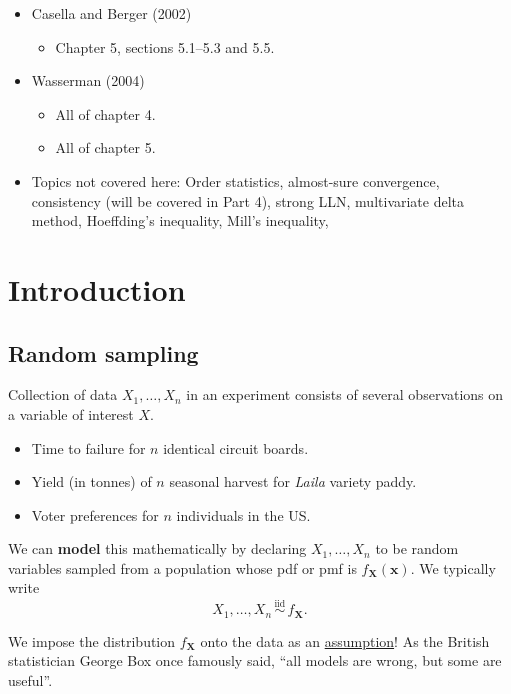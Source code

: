 \documentclass[
]{book}
\providecommand{\tightlist}{%
  \setlength{\itemsep}{0pt}\setlength{\parskip}{0pt}}
\newcommand{\bx}{{\boldsymbol x}}
\newcommand{\bX}{{\boldsymbol X}}
\newcommand{\iid}{\,\overset{\text{iid}}{\sim}\,}
\theoremstyle{definition}
\theoremstyle{definition}
\theoremstyle{definition}
\theoremstyle{definition}
\theoremstyle{remark}
\begin{document}
\begin{itemize}
\tightlist
\item
  Casella and Berger (2002)

  \begin{itemize}
  \tightlist
  \item
    Chapter 5, sections 5.1--5.3 and 5.5.
  \end{itemize}
\item
  Wasserman (2004)

  \begin{itemize}
  \tightlist
  \item
    All of chapter 4.
  \item
    All of chapter 5.
  \end{itemize}
\item
  Topics not covered here: Order statistics, almost-sure convergence, consistency (will be covered in Part 4), strong LLN, multivariate delta method, Hoeffding's inequality, Mill's inequality,
\end{itemize}

\hypertarget{introduction-1}{%
\section{Introduction}\label{introduction-1}}

\hypertarget{random-sampling}{%
\subsection{Random sampling}\label{random-sampling}}

Collection of data \(X_1,\dots,X_n\) in an experiment consists of several observations on a variable of interest \(X\).

\begin{itemize}
\tightlist
\item
  Time to failure for \(n\) identical circuit boards.
\item
  Yield (in tonnes) of \(n\) seasonal harvest for \emph{Laila} variety paddy.
\item
  Voter preferences for \(n\) individuals in the US.
\end{itemize}

We can \textbf{model} this mathematically by declaring \(X_1,\dots,X_n\) to be random variables sampled from a population whose pdf or pmf is \(f_{\bX}(\bx)\).
We typically write
\[
X_1,\dots,X_n \iid f_{\bX}.
\]

We impose the distribution \(f_{\bX}\) onto the data as an \uline{assumption}!
As the British statistician George Box once famously said, ``all models are wrong, but some are useful''.
\end{document}

